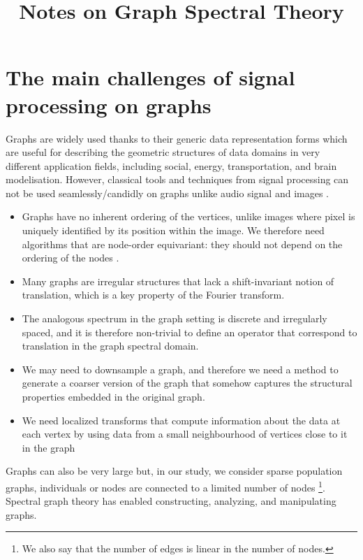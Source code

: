 \documentclass[sigconf]{acmart}
\begin{document}
\title{Notes on Graph Spectral Theory}

\maketitle

\section{The main challenges of signal processing on graphs} 

Graphs are widely used thanks to their generic data representation forms which are useful for describing the geometric structures of data domains in very different application fields, including social, energy, transportation, and brain modelisation.
However, classical tools and techniques from signal processing can not be used seamlessly/candidly on graphs unlike audio signal and images \cite{shuman_emerging_2013}.

\begin{itemize}
    \item Graphs have no inherent ordering of the vertices, unlike images where pixel is uniquely identified by its position within the image. We therefore need algorithms that are node-order equivariant: they should not depend on the ordering of the nodes \cite{daigavane_understanding_2021}.
    \item Many graphs are irregular structures that lack a shift-invariant notion of translation, which is a key property of the Fourier transform.
    \item The analogous spectrum in the graph setting is discrete and irregularly spaced, and it is therefore non-trivial to define an operator that correspond to translation in the graph spectral domain.
    \item We may need to downsample a graph, and therefore we need a method to generate a coarser version of the graph that somehow captures the structural properties embedded in the original graph.
    \item We need localized transforms that compute information about the data at each vertex by using data from a small neighbourhood of vertices close to it in the graph
\end{itemize}
Graphs can also be very large but, in our study, we consider sparse population graphs, \ie individuals or nodes are connected to a limited number of nodes \footnote{We also say that the number of edges is linear in the number of nodes.}.
Spectral graph theory has enabled constructing, analyzing, and manipulating graphs.
\end{document}
